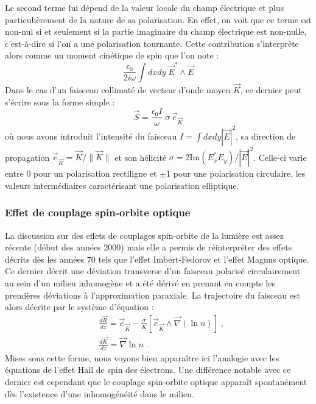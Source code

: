 \documentclass[a4paper,11pt]{article} %
\begin{document}
	Le second terme lui dépend de la valeur locale du champ électrique et plus particulièrement de la nature de sa polarisation. En effet, on voit que ce terme est non-nul si et seulement si la partie imaginaire du champ électrique est non-nulle, c'est-à-dire si l'on a une polarisation tournante. Cette contribution s'interprète alors comme un moment cinétique de spin que l'on note :
		\begin{equation*}
			\frac{\epsilon_0}{2 i \omega} \int \! dx dy \; \vec{E}^* \! \wedge \vec{E}
		\end{equation*}
	Dans le cas d'un faisceau collimaté de vecteur d'onde moyen $ \vec{K} $, ce dernier peut s'écrire sous la forme simple :
	\begin{equation*}
		\vec{S} = \frac{\epsilon_0 I}{\omega} \; \sigma \, \vec{e}_{\vec{K}}
	\end{equation*}
	où nous avons introduit l'intensité du faisceau $ I = \int dx dy |\vec{E}|^2 $, sa direction de propagation $ \vec{e}_{\vec{K}} = \vec{K} / \| \vec{K} \| $ et son hélicité $ \sigma = 2 \text{Im}(E_x^* E_y) / |\vec{E}|^2 $. Celle-ci varie entre 0 pour un polarisation rectiligne et $\pm 1 $ pour une polarisation circulaire, les valeurs intermédiaires caractérisant une polarisation elliptique.
	
	\subsubsection{Effet de couplage spin-orbite optique}
	La discussion sur des effets de couplages spin-orbite de la lumière est assez récente (début des années 2000) mais elle a permis de réinterpréter des effets décrits dès les années 70 tels que l'effet Imbert-Fedorov et l'effet Magnus optique. Ce dernier décrit une déviation transverse d'un faisceau polarisé circulairement au sein d'un milieu inhomogène et a été dérivé en prenant en compte les premières déviations à l'approximation paraxiale. La trajectoire du faisceau est alors décrite par le système  d'équation :
	\begin{align}
		& \frac{d \vec{R} }{dz} = \vec{e}_{\vec{K}} - \frac{\sigma}{K} \left[ \vec{e}_{\vec{K}} \wedge \vec{\nabla}( \ln n ) \right] \; , \label{effet_Magnus_optique2} \\
		& \frac{d \vec{K}}{dz} = \vec{\nabla} \ln n \; .
	\end{align}
	Mises sous cette forme, nous voyons bien apparaître ici l'analogie avec les équations de l'effet Hall de spin des électrons. Une différence notable avec ce dernier est cependant que le couplage spin-orbite optique apparaît spontanément dès l'existence d'une inhomogénéité dans le milieu.
	
\end{document}
